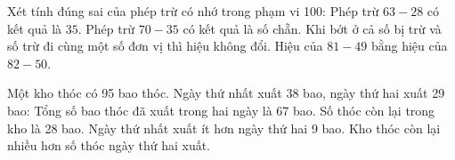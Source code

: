 \begin{ex} %
Xét tính đúng sai của phép trừ có nhớ trong phạm vi 100:
\choiceTF
{\True Phép trừ $63 - 28$ có kết quả là $35$.}
{Phép trừ $70 - 35$ có kết quả là số chẵn.}
{\True Khi bớt ở cả số bị trừ và số trừ đi cùng một số đơn vị thì hiệu không đổi.}
{\True Hiệu của $81 - 49$ bằng hiệu của $82 - 50$.}
\end{ex}

\begin{ex} %
Một kho thóc có 95 bao thóc. Ngày thứ nhất xuất 38 bao, ngày thứ hai xuất 29 bao:
\choiceTF
{\True Tổng số bao thóc đã xuất trong hai ngày là 67 bao.}
{\True Số thóc còn lại trong kho là 28 bao.}
{Ngày thứ nhất xuất ít hơn ngày thứ hai 9 bao.}
{Kho thóc còn lại nhiều hơn số thóc ngày thứ hai xuất.}
\end{ex}

